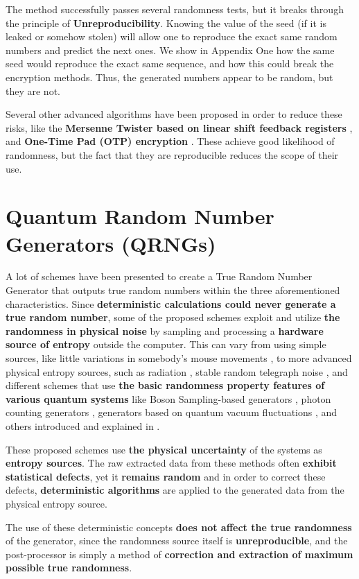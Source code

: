 The method successfully passes several randomness tests, but it breaks through the principle of \textbf{Unreproducibility}. Knowing the value of the seed (if it is leaked or somehow stolen) will allow one to reproduce the exact same random numbers and predict the next ones. We show in Appendix One how the same seed would reproduce the exact same sequence, and how this could break the encryption methods. Thus, the generated numbers appear to be random, but they are not.

Several other advanced algorithms have been proposed in order to reduce these risks, like the \textbf{Mersenne Twister based on linear shift feedback registers} \cite{matsumoto_1998_mersenne}, and \textbf{One-Time Pad (OTP) encryption} \cite{OTP}. These achieve good likelihood of randomness, but the fact that they are reproducible reduces the scope of their use.


\section{Quantum Random Number Generators (QRNGs)}
 A lot of schemes have been presented to create a True Random Number Generator that outputs true random numbers within the three aforementioned characteristics. Since \textbf{deterministic calculations could never generate a true random number}, some of the proposed schemes exploit and utilize \textbf{the randomness in physical noise} by sampling and processing a \textbf{hardware source of entropy} outside the computer. This can vary from using simple sources, like little variations in somebody’s mouse movements \cite{mouse}, to more advanced physical entropy sources, such as radiation \cite{radiation}, stable random telegraph noise \cite{RTN}, and different schemes that use \textbf{the basic randomness property features of various quantum systems} like Boson Sampling-based generators \cite{shi_Twa3na}, photon counting generators \cite{photonic}, generators based on quantum vacuum fluctuations \cite{Vaccum}, and others introduced and explained in \cite{OtherQrngs}.

These proposed schemes use \textbf{the physical uncertainty} of the systems as \textbf{entropy sources}. The raw extracted data from these methods often \textbf{exhibit statistical defects}, yet it \textbf{remains random} and in order to correct these defects, \textbf{deterministic algorithms} are applied to the generated data from the physical entropy source. 

The use of these deterministic concepts \textbf{does not affect the true randomness} of the generator, since the randomness source itself is \textbf{unreproducible}, and the post-processor is simply a method of \textbf{correction and extraction of maximum possible true randomness}.


